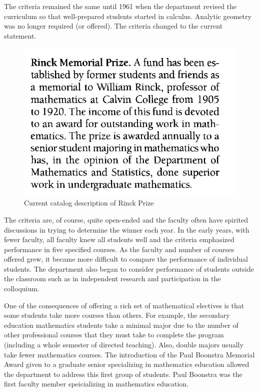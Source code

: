 \documentclass[
]{book}
\begin{document}
The criteria remained the same until 1961 when the department revised the curriculum so that well-prepared students started in calculus. Analytic geometry was no longer required (or offered). The criteria changed to the current statement.

\begin{figure}

{\centering \includegraphics[width=0.6\linewidth]{images/Rinck2000} 

}

\caption{Current catalog description of Rinck Prize}\label{fig:Rinck00}
\end{figure}

The criteria are, of course, quite open-ended and the faculty often have spirited discussions in trying to determine the winner each year. In the early years, with fewer faculty, all faculty knew all students well and the criteria emphasized performance in five specified courses. As the faculty and number of courses offered grew, it became more difficult to compare the performance of individual students. The department also began to consider performance of students outside the classroom such as in independent research and participation in the colloquium.

One of the consequences of offering a rich set of mathematical electives is that some students take more courses than others. For example, the secondary education mathematics students take a minimal major due to the number of other professional courses that they must take to complete the program (including a whole semester of directed teaching). Also, double majors usually take fewer mathematics courses. The introduction of the Paul Boonstra Memorial Award given to a graduate senior specializing in mathematics education allowed the department to address this first group of students. Paul Boonstra was the first faculty member speicializing in mathematics education.
\end{document}
